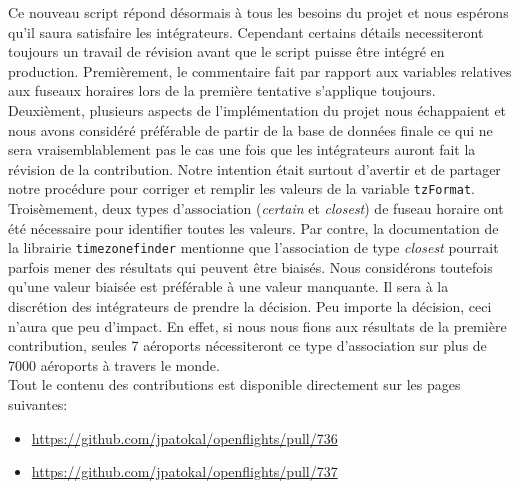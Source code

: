 Ce nouveau script répond désormais à tous les besoins du projet et nous espérons qu'il saura satisfaire les intégrateurs. Cependant certains détails necessiteront toujours un travail de révision avant que le script puisse être intégré en production. Premièrement, le commentaire fait par rapport aux variables relatives aux fuseaux horaires lors de la première tentative s'applique toujours. Deuxièment, plusieurs aspects de l'implémentation du projet nous échappaient et nous avons considéré préférable de partir de la base de données finale ce qui ne sera vraisemblablement pas le cas une fois que les intégrateurs auront fait la révision de la contribution. Notre intention était surtout d'avertir et de partager notre procédure pour corriger et remplir les valeurs de la variable \texttt{tzFormat}. Troisèmement, deux types d'association (\emph{certain} et \emph{closest}) de fuseau horaire ont été nécessaire pour identifier toutes les valeurs. Par contre, la documentation de la librairie \texttt{timezonefinder} mentionne que l'association de type \emph{closest} pourrait parfois mener des résultats qui peuvent être biaisés. Nous considérons toutefois qu'une valeur biaisée est préférable à une valeur manquante. Il sera à la discrétion des intégrateurs de prendre la décision. Peu importe la décision, ceci n'aura que peu d'impact. En effet, si nous nous fions aux résultats de la première contribution, seules 7 aéroports nécessiteront ce type d'association sur plus de 7000 aéroports à travers le monde. \\

Tout le contenu des contributions est disponible directement sur les pages suivantes: 
\begin{itemize}
	\item \url{https://github.com/jpatokal/openflights/pull/736} \\
	\item \url{https://github.com/jpatokal/openflights/pull/737}
\end{itemize}